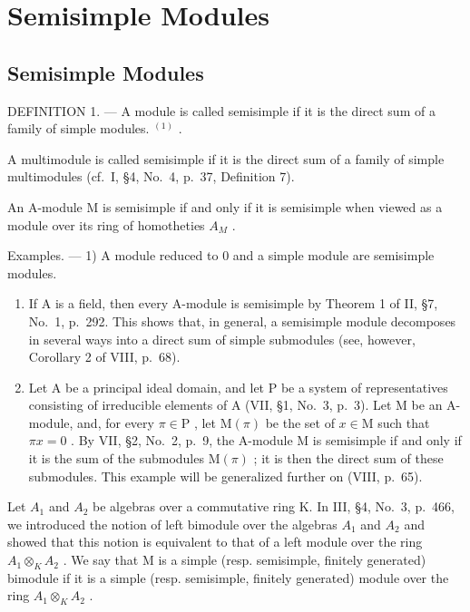 \section{Semisimple Modules}

\subsection{Semisimple Modules}

DEFINITION 1. --- A module is called semisimple if it is the direct sum of a family of simple modules. \(^{(1)}\) .

A multimodule is called semisimple if it is the direct sum of a family of simple multimodules (cf.~I, §4, No.~4, p.~37, Definition 7).

An A-module M is semisimple if and only if it is semisimple when viewed as a module over its ring of homotheties \(A_{M}\) .

Examples. --- 1) A module reduced to 0 and a simple module are semisimple modules.

\begin{enumerate}
\def\labelenumi{\arabic{enumi})}
\setcounter{enumi}{1}
\item
  If A is a field, then every A-module is semisimple by Theorem 1 of II, §7, No.~1, p.~292. This shows that, in general, a semisimple module decomposes in several ways into a direct sum of simple submodules (see, however, Corollary 2 of VIII, p.~68).
\item
  Let A be a principal ideal domain, and let P be a system of representatives consisting of irreducible elements of A (VII, §1, No.~3, p.~3). Let M be an A-module, and, for every \(\pi \in \mathrm{P}\) , let \(\mathrm{M}(\pi)\) be the set of \(x \in \mathrm{M}\) such that \(\pi x = 0\) . By VII, §2, No.~2, p.~9, the A-module M is semisimple if and only if it is the sum of the submodules \(\mathrm{M}(\pi)\) ; it is then the direct sum of these submodules. This example will be generalized further on (VIII, p.~65).
\end{enumerate}

Let \(A_{1}\) and \(A_{2}\) be algebras over a commutative ring K. In III, §4, No.~3, p.~466, we introduced the notion of left bimodule over the algebras \(A_{1}\) and \(A_{2}\) and showed that this notion is equivalent to that of a left module over the ring \(A_{1} \otimes_{K} A_{2}\) . We say that M is a simple (resp. semisimple, finitely generated) bimodule if it is a simple (resp. semisimple, finitely generated) module over the ring \(A_{1} \otimes_{K} A_{2}\) .

